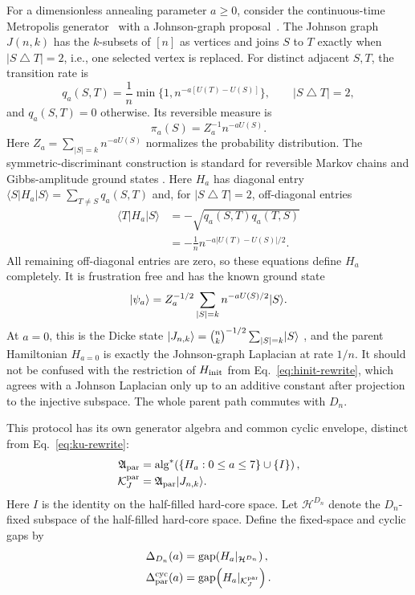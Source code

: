 For a dimensionless annealing parameter $a\geq0$, consider the
continuous-time Metropolis generator~\cite{Metropolis1953} with a
Johnson-graph proposal~\cite{BrouwerCohenNeumaier1989}.  The
Johnson graph $J(n,k)$ has the $k$-subsets of $[n]$ as vertices and joins
$S$ to $T$ exactly when $|S\mathbin\triangle T|=2$, i.e., one selected
vertex is replaced.  For distinct adjacent $S,T$, the transition rate is
\begin{equation}
 q_a(S,T)=\frac1n
 \min\{1,n^{-a[U(T)-U(S)]}\},
 \qquad |S\mathbin\triangle T|=2,
 \label{eq:johnson-metropolis}
\end{equation}
and $q_a(S,T)=0$ otherwise.  Its reversible measure is
\begin{equation}
 \pi_a(S)=Z_a^{-1}n^{-aU(S)}.
 \label{eq:cycle-gibbs}
\end{equation}
Here $Z_a=\sum_{|S|=k}n^{-aU(S)}$ normalizes the probability distribution.
The symmetric-discriminant construction is standard for reversible Markov
chains and Gibbs-amplitude ground states
\cite{Szegedy2004,SommaBoixoBarnumKnill2008}.  Here $H_a$ has diagonal
entry $\langle S|H_a|S\rangle=\sum_{T\ne S}q_a(S,T)$ and, for
$|S\mathbin\triangle T|=2$, off-diagonal entries
\begin{align}
 \langle T|H_a|S\rangle
 &=-\sqrt{q_a(S,T)q_a(T,S)}\\
 &=-\frac1n n^{-a|U(T)-U(S)|/2}.
 \label{eq:cycle-parent}
\end{align}
All remaining off-diagonal entries are zero, so these equations define
$H_a$ completely.
It is frustration free and has the known ground state
\begin{equation}
 \lvert\psi_a\rangle=Z_a^{-1/2}\sum_{|S|=k}n^{-aU(S)/2}\lvert S\rangle.
 \label{eq:cycle-parent-ground}
\end{equation}
At $a=0$, this is the Dicke state
$\lvert J_{n,k}\rangle=\binom nk^{-1/2}\sum_{|S|=k}\lvert S\rangle$
\cite{BartschiEidenbenz2019}, and the parent
Hamiltonian $H_{a=0}$ is exactly the Johnson-graph Laplacian at rate $1/n$.
It should not be confused with the restriction of $H_{\rm init}$ from
Eq.~\eqref{eq:hinit-rewrite}, which agrees with a Johnson Laplacian only up
to an additive constant after projection to the injective subspace.  The
whole parent path commutes with $D_n$.

This protocol has its own generator algebra and common cyclic envelope,
distinct from Eq.~\eqref{eq:ku-rewrite}:
\begin{align}
 \mathfrak A_{\rm par}
 &=\operatorname{alg}^{*}\!\left(\{H_a:0\leq a\leq7\}\cup\{I\}\right),\\
 \mathcal K_J^{\rm par}
 &=\mathfrak A_{\rm par}\lvert J_{n,k}\rangle.
 \label{eq:parent-cyclic-space}
\end{align}
Here $I$ is the identity on the half-filled hard-core space.
Let $\mathcal H^{D_n}$ denote the $D_n$-fixed subspace of the half-filled
hard-core space.  Define the fixed-space and cyclic gaps by
\begin{align}
 \Delta_{D_n}(a)
 &=\operatorname{gap}\!\left(H_a|_{\mathcal H^{D_n}}\right),\\
 \Delta_{\rm par}^{\rm cyc}(a)
 &=\operatorname{gap}\!\left(H_a|_{\mathcal K_J^{\rm par}}\right).
 \label{eq:parent-cyclic-gap}
\end{align}

